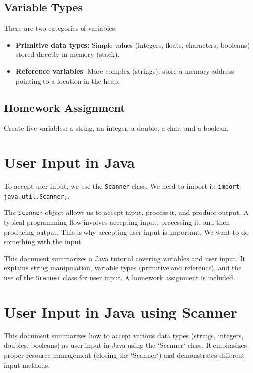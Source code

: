 \documentclass{article}
\begin{document}
\subsection{Variable Types}

There are two categories of variables:

\begin{itemize}
    \item \textbf{Primitive data types:} Simple values (integers, floats, characters, booleans) stored directly in memory (stack).
    \item \textbf{Reference variables:} More complex (strings); store a memory address pointing to a location in the heap.
\end{itemize}

\subsection{Homework Assignment}

Create five variables: a string, an integer, a double, a char, and a boolean.


\section{User Input in Java}

To accept user input, we use the \texttt{Scanner} class.  We need to import it:  \texttt{import java.util.Scanner;}.

The \texttt{Scanner} object allows us to accept input, process it, and produce output.  A typical programming flow involves accepting input, processing it, and then producing output.  This is why accepting user input is important.  We want to do something with the input.


This document summarizes a Java tutorial covering variables and user input.  It explains string manipulation, variable types (primitive and reference), and the use of the \texttt{Scanner} class for user input.  A homework assignment is included.


\section{User Input in Java using Scanner}

This document summarizes how to accept various data types (strings, integers, doubles, booleans) as user input in Java using the `Scanner` class.  It emphasizes proper resource management (closing the `Scanner`) and demonstrates different input methods.
\end{document}
